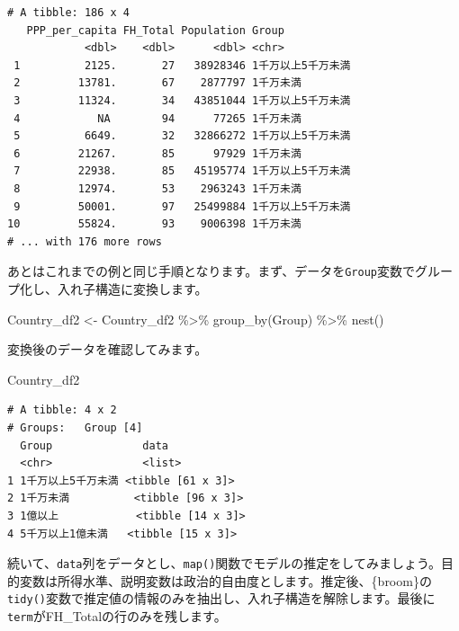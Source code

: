 \documentclass[
  a4paper,
  pandoc,
  ja=standard,
  jafont=haranoaji]{bxjsbook}
\newenvironment{Shaded}{\begin{snugshade}}{\end{snugshade}}
\newcommand{\FunctionTok}[1]{\textcolor[rgb]{0.28,0.35,0.67}{#1}}
\newcommand{\NormalTok}[1]{\textcolor[rgb]{0.00,0.48,0.65}{#1}}
\newcommand{\OtherTok}[1]{\textcolor[rgb]{0.00,0.48,0.65}{#1}}
\newcommand{\SpecialCharTok}[1]{\textcolor[rgb]{0.37,0.37,0.37}{#1}}
\begin{document}
\begin{verbatim}
# A tibble: 186 x 4
   PPP_per_capita FH_Total Population Group             
            <dbl>    <dbl>      <dbl> <chr>             
 1          2125.       27   38928346 1千万以上5千万未満
 2         13781.       67    2877797 1千万未満         
 3         11324.       34   43851044 1千万以上5千万未満
 4            NA        94      77265 1千万未満         
 5          6649.       32   32866272 1千万以上5千万未満
 6         21267.       85      97929 1千万未満         
 7         22938.       85   45195774 1千万以上5千万未満
 8         12974.       53    2963243 1千万未満         
 9         50001.       97   25499884 1千万以上5千万未満
10         55824.       93    9006398 1千万未満         
# ... with 176 more rows
\end{verbatim}

あとはこれまでの例と同じ手順となります。まず、データを\texttt{Group}変数でグループ化し、入れ子構造に変換します。

\begin{Shaded}
\begin{Highlighting}[numbers=left,,]
\NormalTok{Country\_df2 }\OtherTok{\textless{}{-}}\NormalTok{ Country\_df2 }\SpecialCharTok{\%\textgreater{}\%}
  \FunctionTok{group\_by}\NormalTok{(Group) }\SpecialCharTok{\%\textgreater{}\%}
  \FunctionTok{nest}\NormalTok{()}
\end{Highlighting}
\end{Shaded}

変換後のデータを確認してみます。

\begin{Shaded}
\begin{Highlighting}[numbers=left,,]
\NormalTok{Country\_df2}
\end{Highlighting}
\end{Shaded}

\begin{verbatim}
# A tibble: 4 x 2
# Groups:   Group [4]
  Group              data             
  <chr>              <list>           
1 1千万以上5千万未満 <tibble [61 x 3]>
2 1千万未満          <tibble [96 x 3]>
3 1億以上            <tibble [14 x 3]>
4 5千万以上1億未満   <tibble [15 x 3]>
\end{verbatim}

続いて、\texttt{data}列をデータとし、\texttt{map()}関数でモデルの推定をしてみましょう。目的変数は所得水準、説明変数は政治的自由度とします。推定後、\{broom\}の\texttt{tidy()}変数で推定値の情報のみを抽出し、入れ子構造を解除します。最後に\texttt{term}がFH\_Totalの行のみを残します。
\end{document}
